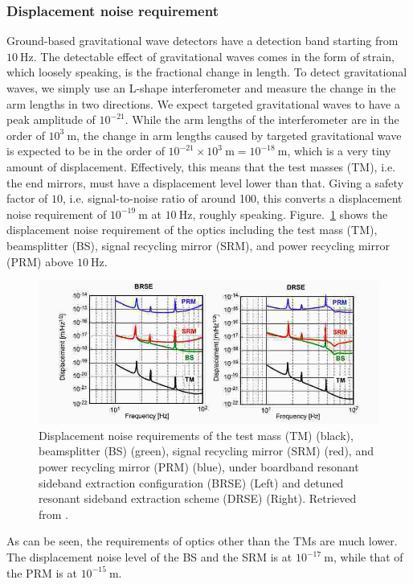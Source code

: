 \subsubsection{Displacement noise requirement}
Ground-based gravitational wave detectors have a detection band starting from $10~\mathrm{Hz}$.
The detectable effect of gravitational waves comes in the form of strain, which loosely speaking, is the fractional change in length.
To detect gravitational waves, we simply use an L-shape interferometer and measure the change in the arm lengths in two directions.
We expect targeted gravitational waves to have a peak amplitude of $10^{-21}$.
While the arm lengths of the interferometer are in the order of $10^{3}~\mathrm{m}$, the change in arm lengths caused by targeted gravitational wave is expected to be in the order of $10^{-21}\times 10^{3}~\mathrm{m}=10^{-18}~\mathrm{m}$, which is a very tiny amount of displacement.
Effectively, this means that the test masses (TM), i.e. the end mirrors, must have a displacement level lower than that.
Giving a safety factor of $10$, i.e. signal-to-noise ratio of around 100, this converts a displacement noise requirement of $10^{-19}~\mathrm{m}$ at $10~\mathrm{Hz}$, roughly speaking. Figure.~\ref{fig:displacementnoiserequirement} shows the displacement noise requirement of the optics including the test mass (TM), beamsplitter (BS), signal recycling mirror (SRM), and power recycling mirror (PRM) above $10~\mathrm{Hz}$.
\begin{figure}[!h]
	\centering
	\includegraphics[width=0.7\linewidth]{figures/displacement_noise_requirement}
	\caption{Displacement noise requirements of the test mass (TM) (black), beamsplitter (BS) (green), signal recycling mirror (SRM) (red), and power recycling mirror (PRM) (blue), under boardband resonant sideband extraction configuration (BRSE) (Left) and detuned resonant sideband extraction scheme (DRSE) (Right). Retrieved from \cite{Sekiguchi:2016bmv}.}
	\label{fig:displacementnoiserequirement}
\end{figure}
As can be seen, the requirements of optics other than the TMs are much lower.
The displacement noise level of the BS and the SRM is at $10^{-17}~\mathrm{m}$, while that of the PRM is at $10^{-15}~\mathrm{m}$.
